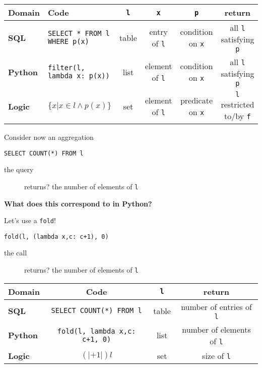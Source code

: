 \documentclass{beamer}
\begin{document}
\begin{textslide}
{
\tiny
\begin{tabular}{| l | p{2cm} | c | c | c | c |}
\hline
\textbf{Domain} & \textbf{Code} & \texttt{l} & \texttt{x} & \texttt{p} & \textbf{return} \\
\hline
\textbf{SQL} & \texttt{SELECT * FROM l WHERE p(x)} & table & entry of \texttt{l} & condition on \texttt{x} & all \texttt{l} satisfying \texttt{p} \\
\hline
\textbf{Python} & \texttt{filter(l, lambda x: p(x))} & list & element of \texttt{l} & condition on \texttt{x} & all \texttt{l} satisfying \texttt{p} \\
\hline
\textbf{Logic} \pause & $\{ x | x \in l \wedge p(x) \}$ & set & element of \texttt{l} & predicate on \texttt{x} & \texttt{l} restricted to/by \texttt{f} \\
\hline
\end{tabular}
}
\end{textslide}

\begin{slide}{
\item Consider now an aggregation
\item \texttt{SELECT COUNT(*) FROM l}
\begin{description}
\item[the query] returns? the number of elements of \texttt{l}
\end{description}
\item \textbf{What does this correspond to in Python?}
}\end{slide}

\begin{slide}{
\item Let's use a \texttt{fold}!
\item \texttt{fold(l, (lambda x,c: c+1), 0)}
\begin{description}
\item[the call] returns? the number of elements of \texttt{l}
\end{description}
}\end{slide}

\begin{textslide}
{
\tiny
\begin{tabular}{| l | c | c | c |}
\hline
\textbf{Domain} & \textbf{Code} & \texttt{l} & \textbf{return} \\
\hline
\textbf{SQL} & \texttt{SELECT COUNT(*) FROM l} & table & number of entries of \texttt{l} \\
\hline
\textbf{Python} & \texttt{fold(l, lambda x,c: c+1, 0)} & list & number of elements of \texttt{l} \\
\hline
\textbf{Logic} \pause & $(|+1|) l $ & set & size of \texttt{l} \\
\hline
\end{tabular}
}
\end{textslide}
\end{document}
